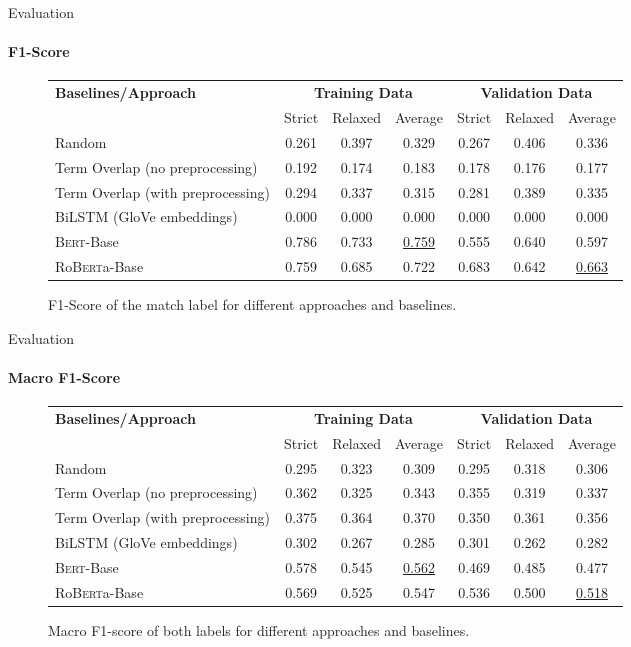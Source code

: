 \documentclass[english,handout]{mlutalk}
\newcommand{\Bert}{\textsc{Bert}\xspace}
\newcommand{\BertBase}{\Bert-Base\xspace}
\newcommand{\Roberta}{\mbox{Ro\textsc{Bert}a}\xspace}
\newcommand{\RobertaBase}{\Roberta-Base\xspace}
\begin{document}
\begin{frame}{Evaluation}
  \framesubtitle{F1-Score}
  \begin{figure}
    \centering
    \caption{F1-Score of the match label for different approaches and baselines.}
    \tiny
    \begin{tabular}{lcccccc}
      \toprule
      \textbf{Baselines/Approach} & \multicolumn{3}{c}{\textbf{Training Data}} & \multicolumn{3}{c}{\textbf{Validation Data}}\\
      \cmidrule(r{0.5em}){2-4} \cmidrule(l{0.5em}){5-7}
      & Strict & Relaxed & Average & Strict & Relaxed & Average\\
      \midrule
      Random 
      & 0.261 & 0.397 & 0.329 & 0.267 & 0.406 & 0.336 \\
      Term Overlap (no preprocessing)
      & 0.192 & 0.174 & 0.183 & 0.178 & 0.176 & 0.177 \\
      Term Overlap (with preprocessing)
      & 0.294 & 0.337 & 0.315 & 0.281 & 0.389 & 0.335 \\
      \midrule
      BiLSTM (GloVe embeddings)
      & 0.000 & 0.000 & 0.000 & 0.000 & 0.000 & 0.000 \\
      \BertBase
      & 0.786 & 0.733 & \underline{0.759} & 0.555 & 0.640 & 0.597 \\
      \RobertaBase
      & 0.759 & 0.685 & 0.722 & 0.683 & 0.642 & \underline{0.663} \\
      \bottomrule
    \end{tabular}
  \end{figure}
\end{frame}

\begin{frame}{Evaluation}
  \framesubtitle{Macro F1-Score}
  \begin{figure}
    \centering
    \caption{Macro F1-score of both labels for different approaches and baselines.}
    \tiny
    \begin{tabular}{lcccccc}
      \toprule
      \textbf{Baselines/Approach} & \multicolumn{3}{c}{\textbf{Training Data}} & \multicolumn{3}{c}{\textbf{Validation Data}}\\
      \cmidrule(r{0.5em}){2-4} \cmidrule(l{0.5em}){5-7}
      & Strict & Relaxed & Average & Strict & Relaxed & Average\\
      \midrule
      Random 
      & 0.295 & 0.323 & 0.309 & 0.295 & 0.318 & 0.306 \\
      Term Overlap (no preprocessing)
      & 0.362 & 0.325 & 0.343 & 0.355 & 0.319 & 0.337 \\
      Term Overlap (with preprocessing)
      & 0.375 & 0.364 & 0.370 & 0.350 & 0.361 & 0.356 \\
      \midrule
      BiLSTM (GloVe embeddings)
      & 0.302 & 0.267 & 0.285 & 0.301 & 0.262 & 0.282 \\
      \BertBase
      & 0.578 & 0.545 & \underline{0.562} & 0.469 & 0.485 & 0.477 \\
      \RobertaBase
      & 0.569 & 0.525 & 0.547 & 0.536 & 0.500 & \underline{0.518} \\
      \bottomrule
    \end{tabular}
  \end{figure}
\end{frame}
\end{document}
